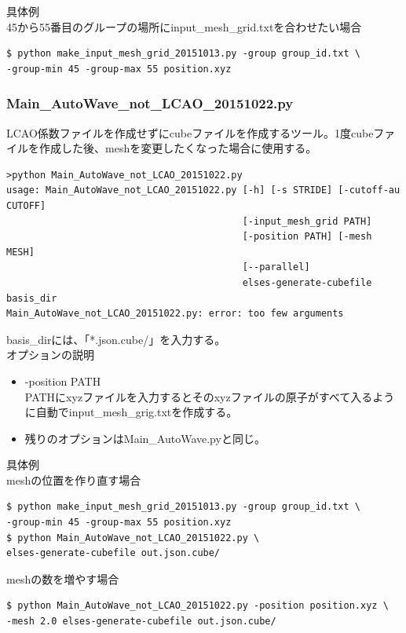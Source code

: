 \documentclass{jsarticle}
\begin{document}
具体例\\
45から55番目のグループの場所にinput\_mesh\_grid.txtを合わせたい場合
\begin{Verbatim}[frame=single]
$ python make_input_mesh_grid_20151013.py -group group_id.txt \
-group-min 45 -group-max 55 position.xyz
\end{Verbatim}


\subsubsection{Main\_AutoWave\_not\_LCAO\_20151022.py}
LCAO係数ファイルを作成せずにcubeファイルを作成するツール。1度cubeファイルを作成した後、meshを変更したくなった場合に使用する。\\
\begin{Verbatim}[frame=single]
>python Main_AutoWave_not_LCAO_20151022.py
usage: Main_AutoWave_not_LCAO_20151022.py [-h] [-s STRIDE] [-cutoff-au CUTOFF]
                                          [-input_mesh_grid PATH]
                                          [-position PATH] [-mesh MESH]
                                          [--parallel]
                                          elses-generate-cubefile basis_dir
Main_AutoWave_not_LCAO_20151022.py: error: too few arguments
\end{Verbatim}
basis\_dirには、「*.json.cube/」を入力する。\\

オプションの説明
\begin{itemize}
\item -position PATH\\
PATHにxyzファイルを入力するとそのxyzファイルの原子がすべて入るように自動でinput\_mesh\_grig.txtを作成する。\\
\item 残りのオプションはMain\_AutoWave.pyと同じ。
\end{itemize}

具体例\\
meshの位置を作り直す場合
\begin{Verbatim}[frame=single]
$ python make_input_mesh_grid_20151013.py -group group_id.txt \
-group-min 45 -group-max 55 position.xyz
$ python Main_AutoWave_not_LCAO_20151022.py \
elses-generate-cubefile out.json.cube/
\end{Verbatim}

meshの数を増やす場合
\begin{Verbatim}[frame=single]
$ python Main_AutoWave_not_LCAO_20151022.py -position position.xyz \
-mesh 2.0 elses-generate-cubefile out.json.cube/
\end{Verbatim}
\end{document}
